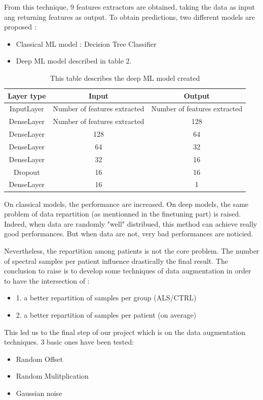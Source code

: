 From this technique, 9 features extractors are obtained, taking the data as input ang returning features as output. To obtain predictions, two different models are proposed :
\begin{itemize}
\item Classical ML model : Decision Tree Classifier
\item Deep ML model described in table 2.
\end{itemize}

\begin{table}[H]
\centering
\begin{threeparttable}
\caption{This table describes the deep ML model created}
\begin{tabular}{ |c|c|c| }
 \hline
  Layer type & Input & Output \\
  \hline
  InputLayer & Number of features extracted & Number of features extracted \\
  DenseLayer & Number of features extracted & 128 \\
  DenseLayer & 128 & 64 \\
  DenseLayer & 64 & 32 \\
  DenseLayer & 32 & 16 \\
  Dropout & 16 & 16 \\
  DenseLayer & 16 & 1 \\
  \hline
\end{tabular}
\end{threeparttable}
\end{table}

On classical models, the performance are increased. 
On deep models, the same problem of data repartition (as mentionned in the finetuning part) is raised. Indeed, when data are randomly "well" distribued, this method can achieve really good performances. But when data are not, very bad performances are noticied.

Nevertheless, the repartition among patients is not the core problem. The number of spectral samples per patient influence drastically the final result. 
The conclusion to raise is to develop some techniques of data augmentation in order to have the intersection of :
\begin{itemize}
\item 1. a better repartition of samples per group (ALS/CTRL)
\item 2. a better repartition of samples per patient (on average)
\end{itemize}
This led us to the final step of our project which is on the data augmentation techniques.
3 basic ones have been tested:
\begin{itemize}
\item Random Offset
\item Random Mulitplication
\item Gaussian noise
\end{itemize}

